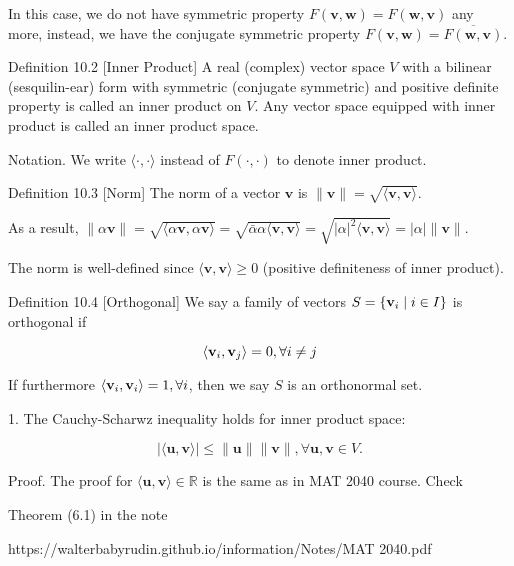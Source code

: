 \documentclass[11pt]{article}
\begin{document}
In this case, we do not have symmetric property \(F\left( {\mathbf{v},\mathbf{w}}\right)  = F\left( {\mathbf{w},\mathbf{v}}\right)\) any more, instead, we have the conjugate symmetric property \(F\left( {\mathbf{v},\mathbf{w}}\right)  = \overline{F\left( {\mathbf{w},\mathbf{v}}\right) }\).

Definition 10.2 [Inner Product] A real (complex) vector space \(V\) with a bilinear (sesquilin-ear) form with symmetric (conjugate symmetric) and positive definite property is called an inner product on \(V\). Any vector space equipped with inner product is called an inner product space.

Notation. We write \(\langle  \cdot  , \cdot  \rangle\) instead of \(F\left( {\cdot , \cdot  }\right)\) to denote inner product.

Definition 10.3 [Norm] The norm of a vector \(\mathbf{v}\) is \(\parallel \mathbf{v}\parallel  = \sqrt{\langle \mathbf{v},\mathbf{v}\rangle }\).

As a result, \(\parallel \alpha \mathbf{v}\parallel  = \sqrt{\langle \alpha \mathbf{v},\alpha \mathbf{v}\rangle } = \sqrt{\bar\alpha\alpha \langle \mathbf{v},\mathbf{v}\rangle } = \sqrt{{\left| \alpha \right| }^2\langle \mathbf{v},\mathbf{v}\rangle } = \left| \alpha \right| \parallel \mathbf{v}\parallel\).

The norm is well-defined since \(\langle \mathbf{v},\mathbf{v}\rangle  \geq  0\) (positive definiteness of inner product).

Definition 10.4 [Orthogonal] We say a family of vectors \(S = \left\{  {{\bf v}_{i} \mid  i \in  I}\right\}\) is orthogonal if

\[
\left\langle  {{\bf v}_{i},{\bf v}_{j}}\right\rangle   = 0,\forall i \neq  j
\]

If furthermore \(\left\langle  {{\bf v}_{i},{\bf v}_{i}}\right\rangle   = 1,\forall i\), then we say \(S\) is an orthonormal set.

1. The Cauchy-Scharwz inequality holds for inner product space:

\[
\left| {\langle \mathbf{u},\mathbf{v}\rangle }\right|  \leq  \parallel \mathbf{u}\parallel \parallel \mathbf{v}\parallel ,\forall \mathbf{u},\mathbf{v} \in  V.
\]

Proof. The proof for \(\langle \mathbf{u},\mathbf{v}\rangle  \in  \mathbb{R}\) is the same as in MAT 2040 course. Check

Theorem (6.1) in the note

https://walterbabyrudin.github.io/information/Notes/MAT 2040.pdf
\end{document}
